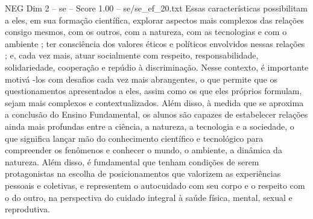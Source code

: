 \begin{textsample}{NEG Dim 2 – se – Score 1.00 – se/se\_ef\_20.txt}
Essas características possibilitam a eles, em sua formação científica, explorar aspectos mais complexos das relações consigo mesmos, com os outros, com a natureza, com as tecnologias e com o ambiente ; ter consciência dos valores éticos e políticos envolvidos nessas relações ; e, cada vez mais, atuar socialmente com respeito, responsabilidade, solidariedade, cooperação e repúdio à discriminação.
Nesse contexto, é importante motivá -los com desafios cada vez mais abrangentes, o que permite que os questionamentos apresentados a eles, assim como os que eles próprios formulam, sejam mais complexos e contextualizados.
Além disso, à medida que se aproxima a conclusão do Ensino Fundamental, os alunos são capazes de estabelecer relações ainda mais profundas entre a ciência, a natureza, a tecnologia e a sociedade, o que significa lançar mão do conhecimento científico e tecnológico para compreender os fenômenos e conhecer o mundo, o ambiente, a dinâmica da natureza.
Além disso, é fundamental que tenham condições de serem protagonistas na escolha de posicionamentos que valorizem as experiências pessoais e coletivas, e representem o autocuidado com seu corpo e o respeito com o do outro, na perspectiva do cuidado integral à saúde física, mental, sexual e reprodutiva.

\end{textsample}

